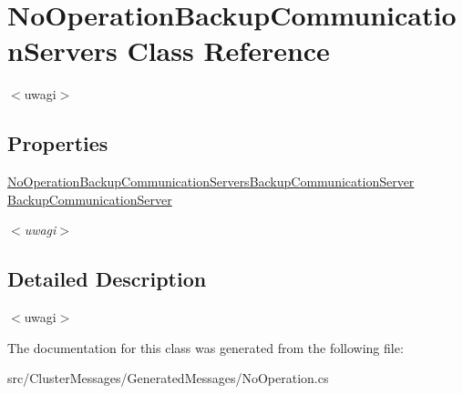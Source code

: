 \hypertarget{class_no_operation_backup_communication_servers}{}\section{No\+Operation\+Backup\+Communication\+Servers Class Reference}
\label{class_no_operation_backup_communication_servers}


$<$uwagi$>$  


\subsection*{Properties}
\begin{DoxyCompactItemize}
\item 
\hypertarget{class_no_operation_backup_communication_servers_a0a8a0a4824600de87cc8f1b71aef0843}{}\hyperlink{class_no_operation_backup_communication_servers_backup_communication_server}{No\+Operation\+Backup\+Communication\+Servers\+Backup\+Communication\+Server} \hyperlink{class_no_operation_backup_communication_servers_a0a8a0a4824600de87cc8f1b71aef0843}{Backup\+Communication\+Server}\label{class_no_operation_backup_communication_servers_a0a8a0a4824600de87cc8f1b71aef0843}

\begin{DoxyCompactList}\small\item\em $<$uwagi$>$ \end{DoxyCompactList}\end{DoxyCompactItemize}


\subsection{Detailed Description}
$<$uwagi$>$ 

The documentation for this class was generated from the following file\+:\begin{DoxyCompactItemize}
\item 
src/\+Cluster\+Messages/\+Generated\+Messages/No\+Operation.\+cs\end{DoxyCompactItemize}
